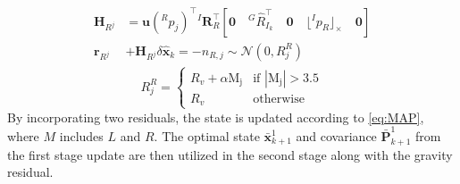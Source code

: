 \vspace{-4mm}\small
\begin{eqnarray}
\begin{aligned}
  \label{eq:radar measurement model}
    \textbf{H}_{R^j}&=%
    \textbf{u}({}^Rp_j)^\top {}^I\textbf{R}_R^\top\left[\textbf{0}\quad{}^G\widehat{R}_{I_k}^\top\quad\textbf{0}\quad\lfloor{}^Ip_{R}\rfloor_\times\quad\textbf{0}\right] \nonumber\\
    \textbf{r}_{R^j}&+\textbf{H}_{R^j}\delta\widehat{\textbf{x}}_k=-n_{R,j}\sim\mathcal{N}(0,R_j^R) \nonumber
\end{aligned}
\end{eqnarray} \vspace{-3mm}
\begin{equation}
       R_j^R = 
        \begin{cases}
            R_v+\alpha\mathrm{M_j} & \text{if $\left|\mathrm{M_j}\right|>3.5 $} \\
            R_v & \text{otherwise}
        \end{cases}
\end{equation}
\normalsize
By incorporating two residuals, the state is updated according to \eqref{eq:MAP}, where $M$ includes $L$ and $R$. The optimal state $\bar{\textbf{x}}_{k+1}^1$ and covariance $\bar{\mathbf{P}}_{k+1}^1$ from the first stage update are then utilized in the second stage along with the gravity residual.



